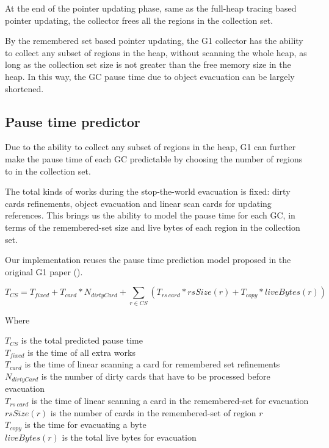 At the end of the pointer updating phase, same as the full-heap tracing based
pointer updating, the collector frees all the regions in the collection set.

By the remembered set based pointer updating, the G1 collector has the ability to collect
any subset of regions in the heap, without scanning the whole heap, as long as the collection set size is not greater
than the free memory size in the heap. In this way, the GC pause time due to object evacuation
can be largely shortened.

\subsection{Pause time predictor}

Due to the ability to collect any subset of regions in the heap, G1 can further
make the pause time of each GC predictable by choosing the number of regions to in the collection set.

The total kinds of works during the stop-the-world evacuation is fixed:
dirty cards refinements, object evacuation and linear scan cards for updating references.
This brings us the ability to model the pause time for each GC, in terms of the remembered-set
size and live bytes of each region in the collection set.

Our implementation reuses the pause time prediction model proposed in the
original G1 paper (\cite{detlefs2004garbage}).

$$
T_{CS} = T_{fixed} + T_{card} * N_{dirtyCard} + \sum_{r\in CS} (T_{rs\ card} * rsSize(r) + T_{copy} * liveBytes(r))
$$

\noindent Where

\noindent$T_{CS}$ is the total predicted pause time\\
$T_{fixed}$ is the time of all extra works\\
$T_{card}$ is the time of linear scanning a card for remembered set refinements\\
$N_{dirtyCard}$ is the number of dirty cards that have to be processed before evacuation\\
$T_{rs\ card}$ is the time of linear scanning a card in the remembered-set for evacuation\\
$rsSize(r)$ is the number of cards in the remembered-set of region $r$\\
$T_{copy}$ is the time for evacuating a byte\\
$liveBytes(r)$ is the total live bytes for evacuation\\

